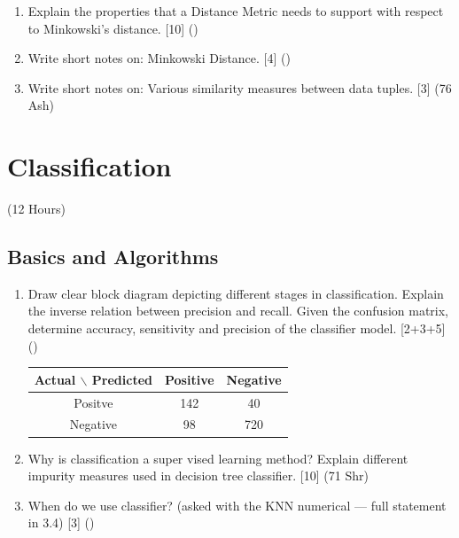 \documentclass[12pt]{article}
\begin{document}
\begin{enumerate}[topsep=0pt, noitemsep]
      \item Explain the properties that a Distance Metric needs to support with respect to Minkowski's distance. \hfill [10] ()

      \item Write short notes on: Minkowski Distance. \hfill [4] ()

      \item Write short notes on: Various similarity measures between data tuples. \hfill [3] (76 Ash)
    \end{enumerate}

\pagebreak
\section{Classification}
\begin{center}(12 Hours)\end{center}

  \subsection{Basics and Algorithms}
    \begin{enumerate}[topsep=0pt, noitemsep]
      \item Draw clear block diagram depicting different stages in classification. Explain the inverse relation between precision and recall. Given the confusion matrix, determine accuracy, sensitivity and precision of the classifier model. \hfill [2+3+5] ()\\
        \small
        \begin{tabular}{|c|c|c|}
          \hline
          Actual $\backslash$ Predicted & Positive & Negative \\ \hline
          Positve & 142 & 40 \\ \hline
          Negative & 98 & 720 \\ \hline
        \end{tabular}
        \normalsize

      \item Why is classification a super vised learning method? Explain different impurity measures used in decision tree classifier. \hfill [10] (71 Shr)

      \item When do we use classifier? (asked with the KNN numerical --- full statement in 3.4) \hfill [3] ()
    \end{enumerate}
\end{document}
